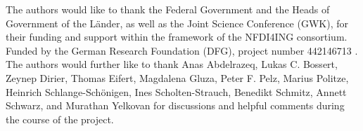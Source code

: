 

The authors would like to thank the Federal Government and the Heads of Government of the Länder, as well as the Joint Science Conference (GWK), for their funding and support within the framework of the NFDI4ING consortium. Funded by the German Research Foundation (DFG), project number 442146713 \cite{noauthor_dfg_nodate}. 
The authors would further like to thank Anas Abdelrazeq, Lukas C. Bossert, Zeynep Dirier, Thomas Eifert, Magdalena Gluza,  Peter F. Pelz, Marius Politze, Heinrich Schlange-Schönigen, Ines Scholten-Strauch, Benedikt Schmitz, Annett Schwarz, and Murathan Yelkovan for discussions and helpful comments during the course of the project.